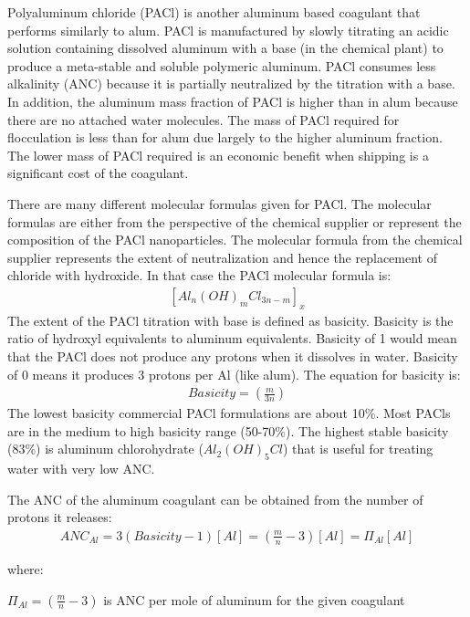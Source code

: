 \documentclass[letterpaper,10pt,english]{sphinxmanual}
\begin{document}
Polyaluminum chloride (PACl) is another aluminum based coagulant that performs similarly to alum. PACl is manufactured by slowly titrating an acidic solution containing dissolved aluminum with a base (in the chemical plant) to produce a meta-stable and soluble polymeric aluminum. PACl consumes less alkalinity (ANC) because it is partially neutralized by the titration with a base. In addition, the aluminum mass fraction of PACl is higher than in alum because there are no attached water molecules. The mass of PACl required for flocculation is less than for alum due largely to the higher aluminum fraction. The lower mass of PACl required is an economic benefit when shipping is a significant cost of the coagulant.

There are many different molecular formulas given for PACl. The molecular formulas are either from the perspective of the chemical supplier or represent the composition of the PACl nanoparticles. The molecular formula from the chemical supplier represents the extent of neutralization and hence the replacement of chloride with hydroxide. In that case the PACl molecular formula is:
\begin{equation}\label{equation:Rapid_Mix/RM_Intro:Rapid_Mix/RM_Intro:1}
\begin{split}[Al_n(OH)_mCl_{3n-m}]_x\end{split}
\end{equation}
The extent of the PACl titration with base is defined as basicity. Basicity is the ratio of hydroxyl equivalents to aluminum equivalents. Basicity of 1 would mean that the PACl does not produce any protons when it dissolves in water. Basicity of 0 means it produces 3 protons per Al (like alum). The equation for basicity is:
\begin{equation}\label{equation:Rapid_Mix/RM_Intro:Rapid_Mix/RM_Intro:2}
\begin{split}Basicity = \left( \frac{m}{3n}\right)\end{split}
\end{equation}
The lowest basicity commercial PACl formulations are about 10\%. Most PACls are in the medium to high basicity range (50-70\%). The highest stable basicity (83\%) is aluminum chlorohydrate (\(Al_2(OH)_5Cl\)) that is useful for treating water with very low ANC.

The ANC of the aluminum coagulant can be obtained from the number of protons it releases:
\begin{equation}\label{equation:Rapid_Mix/RM_Intro:Rapid_Mix/RM_Intro:3}
\begin{split}ANC_{Al} = 3(Basicity-1)[Al] = \left(\frac{m}{n} - 3\right)[Al] = \Pi_{Al}[Al]\end{split}
\end{equation}
\begin{DUlineblock}{0em}
\item[] where:
\item[] \(\Pi_{Al}=\left(\frac{m}{n} - 3\right)\) is ANC per mole of aluminum for the given coagulant
\end{DUlineblock}
\end{document}
